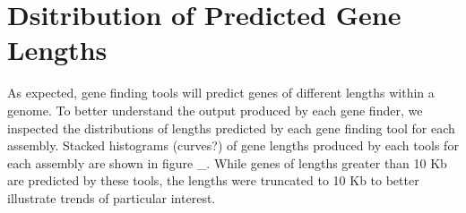 \section{Dsitribution of Predicted Gene Lengths}

As expected, gene finding tools will predict genes of different
lengths within a genome. To better understand the output produced by
each gene finder, we inspected the distributions of lengths predicted
by each gene finding tool for each assembly. Stacked histograms
(curves?)  of gene lengths produced by each tools for each assembly
are shown in figure \_. While genes of lengths greater than 10 Kb are
predicted by these tools, the lengths were truncated to 10 Kb to
better illustrate trends of particular interest.
